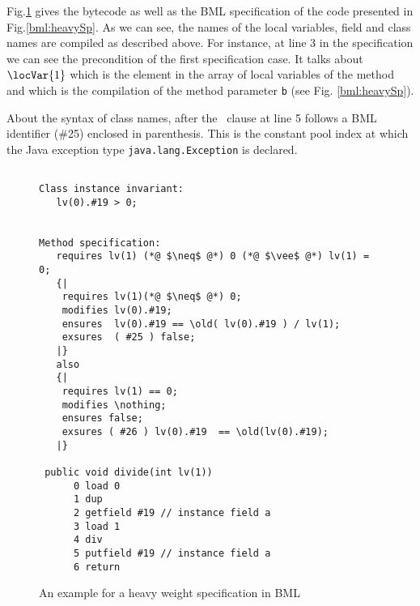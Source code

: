  Fig.\ref{bml:heavySpBML} gives the bytecode as well as the BML specification
 of the code presented in   Fig.\ref{bml:heavySp}. As we can see, the names of the local variables, field and class names  
 are compiled as described above.
 For instance, at line 3 in the specification we can see the precondition of the first specification case.
 It talks about $\locVar{1}$ which is the element in the array of local variables
 of the method  and which is the compilation of  the method parameter \texttt{b} (see Fig. \ref{bml:heavySp}). 

About the syntax of class names,  after the
 \exsures \ clause at line 5 follows a BML identifier (\#25) enclosed in parenthesis.
 This is the constant pool index at which the Java exception  type \texttt{java.lang.Exception} is declared.
 
\begin{figure}[ht!]
\begin{lstlisting}[frame=trbl]

Class instance invariant: 
   lv(0).#19 > 0;
 

Method specification:
   requires lv(1) (*@ $\neq$ @*) 0 (*@ $\vee$ @*) lv(1) = 0;
   {| 
    requires lv(1)(*@ $\neq$ @*) 0;
    modifies lv(0).#19;
    ensures  lv(0).#19 == \old( lv(0).#19 ) / lv(1);
    exsures  ( #25 ) false;  
   |}
   also 
   {|
    requires lv(1) == 0;
    modifies \nothing;
    ensures false;
    exsures ( #26 ) lv(0).#19  == \old(lv(0).#19);
   |}

 public void divide(int lv(1)) 
      0 load 0
      1 dup
      2 getfield #19 // instance field a
      3 load 1
      4 div
      5 putfield #19 // instance field a
      6 return
\end{lstlisting}
\caption{\sc An example for a heavy weight specification in BML} \label{bml:heavySpBML}
\end{figure}

